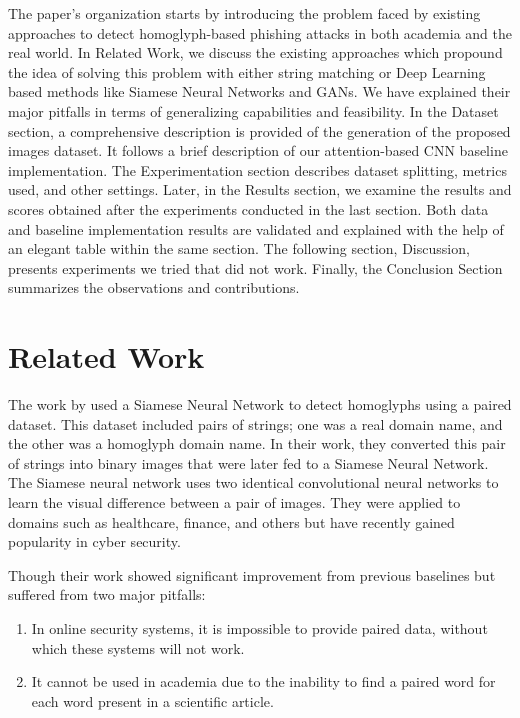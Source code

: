 \documentclass[letterpaper]{article} \usepackage{aaai22}  \usepackage{times}  \usepackage{helvet}  \usepackage{courier}  \usepackage[hyphens]{url}  \usepackage{graphicx} \urlstyle{rm} \def\UrlFont{\rm}  \usepackage{natbib}  \usepackage{caption} \DeclareCaptionStyle{ruled}{labelfont=normalfont,labelsep=colon,strut=off} \frenchspacing  \setlength{\pdfpagewidth}{8.5in}  \setlength{\pdfpageheight}{11in}  \usepackage{algorithm}
\begin{document}
The paper's organization starts by introducing the problem faced by existing approaches to detect homoglyph-based phishing attacks in both academia and the real world. In Related Work, we discuss the existing approaches which propound the idea of solving this problem with either string matching or Deep Learning based methods like Siamese Neural Networks and GANs. We have explained their major pitfalls in terms of generalizing capabilities and feasibility. In the Dataset section, a comprehensive description is provided of the generation of the proposed images dataset. It follows a brief description of our attention-based CNN baseline implementation. The Experimentation section describes dataset splitting, metrics used, and other settings. Later, in the Results section, we examine the results and scores obtained after the experiments conducted in the last section. Both data and baseline implementation results are validated and explained with the help of an elegant table within the same section. The following section, Discussion, presents experiments we tried that did not work. Finally, the Conclusion Section summarizes the observations and contributions.

\section{Related Work}

The work by \cite{ginsberg2018rapid} used a Siamese Neural Network to detect homoglyphs using a paired dataset. This dataset included pairs of strings; one was a real domain name, and the other was a homoglyph domain name. In their work, they converted this pair of strings into binary images that were later fed to a Siamese Neural Network\cite{koch2015siamese}. The Siamese neural network uses two identical convolutional neural networks\cite{lecun1995convolutional} to learn the visual difference between a pair of images. They were applied to domains such as healthcare, finance, and others but have recently gained popularity in cyber security.

Though\cite{lecun1995convolutional} their work showed significant improvement from previous baselines but suffered from two major pitfalls: 
\begin{enumerate}
\item In online security systems, it is impossible to provide paired data, without which these systems will not work. 

\item It cannot be used in academia due to the inability to find a paired word for each word present in a scientific article. 
\end{enumerate}
\end{document}
